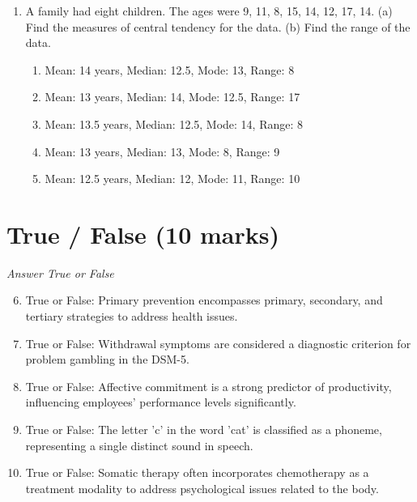 \documentclass[12pt]{article}
\begin{document}
\begin{enumerate}[label=\arabic*.]
\begin{enumerate}[label=(\alph*)]
    \item Homeostatic regulation
    \item Hierarchy of needs
    \item Self-determination theory
    \item Intrinsic motivation
    \item Maslow's pyramid of desire
\end{enumerate}
\item A family had eight children. The ages were 9, 11, 8, 15, 14, 12, 17, 14. (a) Find the measures of central tendency for the data. (b) Find the range of the data.
\begin{enumerate}[label=(\alph*)]
    \item Mean: 14 years, Median: 12.5, Mode: 13, Range: 8
    \item Mean: 13 years, Median: 14, Mode: 12.5, Range: 17
    \item Mean: 13.5 years, Median: 12.5, Mode: 14, Range: 8
    \item Mean: 13 years, Median: 13, Mode: 8, Range: 9
    \item Mean: 12.5 years, Median: 12, Mode: 11, Range: 10
\end{enumerate}
\end{enumerate}

\section*{True / False (10 marks)}
\textit{Answer True or False}
\begin{enumerate}[label=\arabic*.]
\setcounter{enumi}{5}
\item True or False: Primary prevention encompasses primary, secondary, and tertiary strategies to address health issues.
\item True or False: Withdrawal symptoms are considered a diagnostic criterion for problem gambling in the DSM-5.
\item True or False: Affective commitment is a strong predictor of productivity, influencing employees' performance levels significantly.
\item True or False: The letter 'c' in the word 'cat' is classified as a phoneme, representing a single distinct sound in speech.
\item True or False: Somatic therapy often incorporates chemotherapy as a treatment modality to address psychological issues related to the body.
\end{enumerate}
\end{document}
